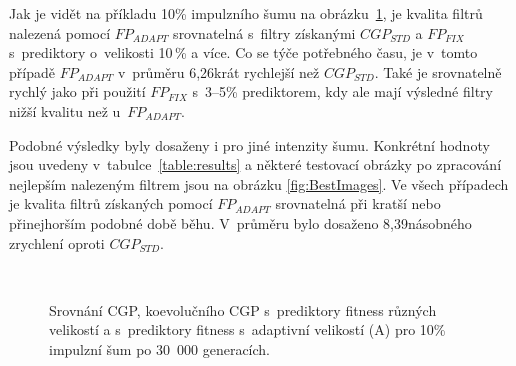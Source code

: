 \documentclass[czech]{ExcelAtFIT} %
\begin{document}
Jak je vidět na příkladu 10\% impulzního šumu na obrázku~\ref{fig:ImpulseBoxplot}, je kvalita filtrů nalezená pomocí $\mathit{FP_{ADAPT}}$ srovnatelná s~filtry získanými $\mathit{CGP_{STD}}$ a $\mathit{FP_{FIX}}$ s~pre\-dik\-tory o~velikosti 10\,\% a více. Co se týče potřebného času, je v~tomto případě $\mathit{FP_{ADAPT}}$ v~průměru 6,26krát rychlejší než $\mathit{CGP_{STD}}$. Také je srovnatelně rychlý jako při použití $\mathit{FP_{FIX}}$ s~3--5\% pre\-dik\-to\-rem, kdy ale mají výsledné filtry nižší kvalitu než u~$\mathit{FP_{ADAPT}}$.

Podobné výsledky byly dosaženy i pro jiné in\-ten\-zity šumu. Konkrétní hodnoty jsou uvedeny v~ta\-bulce~\ref{table:results} a některé testovací obrázky po zpracování nej\-lepším nalezeným filtrem jsou na obrázku \ref{fig:BestImages}. Ve všech pří\-pa\-dech je kvalita filtrů získaných pomocí $\mathit{FP_{ADAPT}}$ srovnatelná při kratší nebo přinejhorším podobné době běhu. V~průměru bylo dosaženo 8,39násobného zrychlení oproti $\mathit{CGP_{STD}}$.


\begin{figure}[ht]
    \centering
    \\
    \caption{Srovnání CGP, koevolučního CGP s~prediktory fitness různých velikostí a s~prediktory fitness s~adaptivní velikostí (A) pro 10\% impulzní šum po 30~000 generacích.}
    \label{fig:ImpulseBoxplot}
\end{figure}
\end{document}
